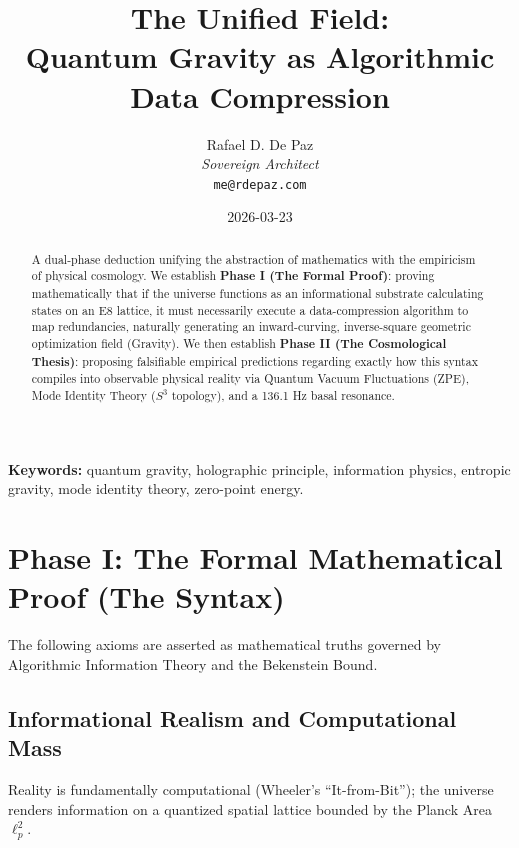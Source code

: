 \documentclass[12pt, a4paper]{article}
\theoremstyle{plain}
\theoremstyle{definition}
\begin{document}
\title{\textbf{
  The Unified Field: \\
  Quantum Gravity as Algorithmic Data Compression}}
\author{Rafael D. De Paz \\ \textit{Sovereign Architect} \\ \texttt{me@rdepaz.com}}
\date{2026-03-23}
\maketitle

\begin{abstract}
A dual-phase deduction unifying the abstraction of mathematics with the empiricism of physical cosmology. We establish \textbf{Phase I (The Formal Proof)}: proving mathematically that if the universe functions as an informational substrate calculating states on an E8 lattice, it must necessarily execute a data-compression algorithm to map redundancies, naturally generating an inward-curving, inverse-square geometric optimization field (Gravity). We then establish \textbf{Phase II (The Cosmological Thesis)}: proposing falsifiable empirical predictions regarding exactly how this syntax compiles into observable physical reality via Quantum Vacuum Fluctuations (ZPE), Mode Identity Theory ($S^3$ topology), and a 136.1 Hz basal resonance.
\end{abstract}

\vspace{1em}
\noindent\textbf{Keywords:} quantum gravity, holographic principle, information physics, entropic gravity, mode identity theory, zero-point energy.

\section{Phase I: The Formal Mathematical Proof (The Syntax)}

The following axioms are asserted as mathematical truths governed by Algorithmic Information Theory and the Bekenstein Bound.

\subsection{Informational Realism and Computational Mass}

\begin{axiom}
Reality is fundamentally computational (Wheeler's ``It-from-Bit''); the universe renders information on a quantized spatial lattice bounded by the Planck Area \(\ell_p^2\).
\end{axiom}
\end{document}
